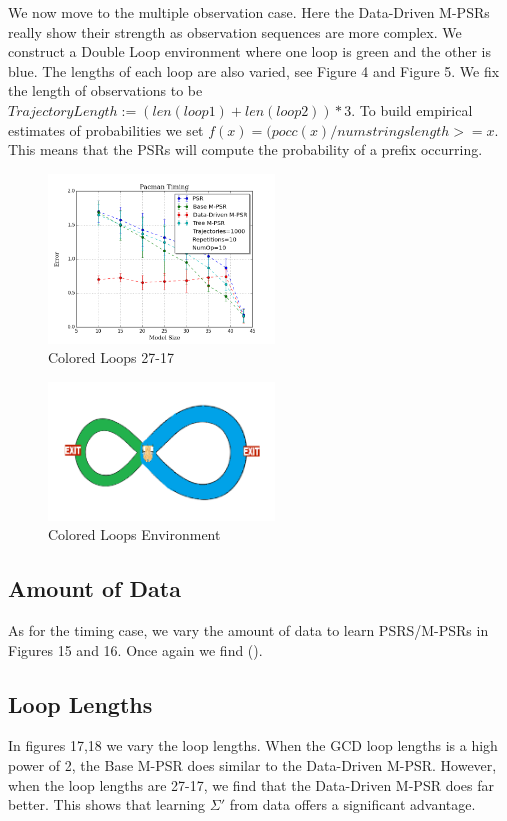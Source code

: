 We now move to the multiple observation case. Here the Data-Driven M-PSRs really show their strength as observation sequences are more complex. We construct a Double Loop environment where one loop is green and the other is blue. The lengths of each loop are also varied, see Figure 4 and Figure 5. We fix the length of observations to be $TrajectoryLength := (len(loop1) + len(loop2))*3$. To build empirical estimates of probabilities we set $f(x)=(pocc(x)/numstringslength>=x$. This means that the PSRs will compute the probability of a prefix occurring.

\begin{figure}[ht!]
\centering
\includegraphics[width=60mm]{uCOREPICS/DLMO/MO_1k.png}
\caption{Colored Loops 27-17\label{overflow}}
\end{figure}

\begin{figure}[ht!]
\centering
\includegraphics[width=60mm]{uCOREPICS/DLMO/doubleLoopImageMO.png}
\caption{Colored Loops Environment\label{overflow}}
\end{figure}

\subsection{Amount of Data}

As for the timing case, we vary the amount of data to learn PSRS/M-PSRs in Figures 15 and 16. Once again we find ().

\subsection{Loop Lengths}
In figures 17,18 we vary the loop lengths. When the GCD loop lengths is a high power of 2, the Base M-PSR does similar to the Data-Driven M-PSR. However, when the loop lengths are 27-17, we find that the Data-Driven M-PSR does far better. This shows that learning $\Sigma'$ from data offers a significant advantage.

